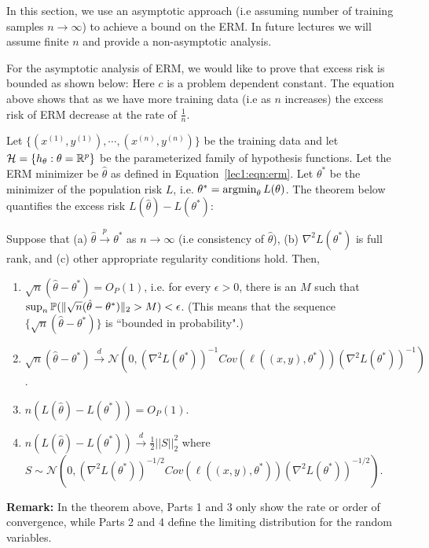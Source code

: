 
In this section, we use an asymptotic approach (i.e assuming number of training samples $n \to \infty$) to achieve a bound on the ERM. In future lectures we will assume finite $n$ and provide a non-asymptotic analysis. 

For the asymptotic analysis of ERM, we would like to prove that excess risk is bounded as shown below:
Here $c$ is a problem dependent constant. The equation above shows that as we have more training data (i.e as $n$ increases) the excess risk of ERM decrease at the rate of $\frac{1}{n}$.

Let $\{(x^{(1)},y^{(1)}), \cdots, (x^{(n)},y^{(n)})\}$ be the training data and let $\mathcal H = \{ h_\theta: \theta = \mathbb R^p \}$ be the parameterized family of hypothesis functions. Let the ERM minimizer be $\hat{\theta}$ as defined in Equation~\eqref{lec1:eqn:erm}. Let $\theta^{*}$ be the minimizer
of the population risk $L$, i.e. $\theta^{*} = \operatorname*{\textup{argmin}}_\theta L(\theta)$. The theorem below quantifies the excess risk $L(\hat{\theta}) - L(\theta^{*})$:

\begin{theorem} 
Suppose that (a) $\hat{\theta}  \overset{p}{\to} \theta^{*}$ as $n \to \infty$ (i.e consistency of $\hat{\theta}$), (b) $\nabla^{2}L(\theta^{*})$ is full rank, and  (c) other appropriate regularity conditions hold. Then,
\begin{enumerate}
    \item $\sqrt{n} (\hat{\theta} - \theta^{*}) = O_P(1)$, i.e. for every $\epsilon > 0$, there is an $M$ such that $\sup_n \mathbb P (\| \sqrt{n} (\hat{\theta} - \theta^{*}) \|_2 > M) < \epsilon$. (This means that the sequence $\{ \sqrt{n} (\hat{\theta} - \theta^{*}) \}$ is ``bounded in probability".)
    
    \item  $\sqrt{n}(\hat{\theta}-\theta^{*}) \overset{d}{\to} \mathcal{N} \left(0, (\nabla^{2}L(\theta^{*}))^{-1}Cov(\ell((x,y), \theta^*)) (\nabla^{2}L(\theta^{*}))^{-1} \right)$.
     \item $n (L(\hat{\theta}) - L(\theta^{*})) = O_P(1)$.
    \item $n (L(\hat{\theta}) - L(\theta^{*})) \overset{d}{\to} \frac{1}{2} ||S||_{2}^{2}$ where $S \sim \mathcal{N} \left(0, (\nabla^{2}L(\theta^{*}))^{-1/2}Cov(\ell((x,y), \theta^*)) (\nabla^{2}L(\theta^{*}))^{-1/2} \right)$.
\end{enumerate}
\label{lec1:thm:asymp}
\end{theorem}
\textbf{Remark:} In the theorem above, Parts 1 and 3 only show the rate or order of convergence, while Parts 2 and 4 define the limiting distribution for the random variables.

